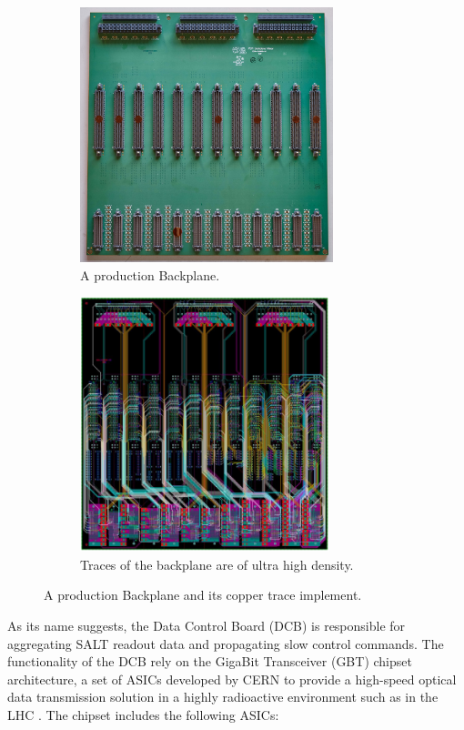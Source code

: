 \begin{figure}[!htb]
    \centering
    \begin{subfigure}[t]{0.48\textwidth}
        \centering
        \includegraphics[height=20em]{./figs-ut-upgrade/backplane/backplane_compressed.jpg}
        \caption{
            A production Backplane.
        }
    \end{subfigure}
    \hspace{10pt}
    \begin{subfigure}[t]{0.48\textwidth}
        \centering
        \includegraphics[height=20em]{./figs-ut-upgrade/backplane/backplane_trace.pdf}
        \caption{
            Traces of the backplane are of ultra high density.
        }
    \end{subfigure}

    \caption{
        A production Backplane and its copper trace implement.
    }
    \label{fig:backplane}
\end{figure}

As its name suggests, the Data Control Board (DCB) is responsible for
aggregating SALT readout data and propagating slow control commands.
The functionality of the DCB rely on the GigaBit Transceiver (GBT)
chipset architecture,
a set of ASICs developed by CERN to provide a high-speed optical data
transmission solution in a highly radioactive environment such as in the LHC
\cite{P_Moreira_2010}.
The chipset includes the following ASICs:

